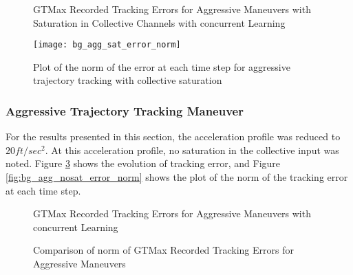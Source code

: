 \begin{figure}[H]
\centering
{}
\caption{GTMax Recorded Tracking Errors for Aggressive Maneuvers with Saturation in Collective Channels with concurrent Learning}
\label{fig:oval_sat_errors}
\end{figure}

\begin{figure}[H]
\centering
\texttt{[image: bg\_agg\_sat\_error\_norm]}
\caption{Plot of the norm of the error at each time step for aggressive trajectory tracking with collective saturation}
\label{fig:bg_agg_Sat_error_norm}
\end{figure}

\subsubsection{Aggressive Trajectory Tracking Maneuver}
For the results presented in this section, the acceleration profile was reduced to $20ft/sec^2$. At this acceleration profile, no saturation in the collective input was noted. Figure \ref{fig:oval_nosat_errors} shows the evolution of tracking error, and Figure \ref{fig:bg_agg_nosat_error_norm} shows the plot of the norm of the tracking error at each time step.
\begin{figure}[H]
\centering
{}
\caption{GTMax Recorded Tracking Errors for Aggressive Maneuvers with concurrent Learning}
\label{fig:oval_nosat_errors}
\end{figure}

\begin{figure}[H]
\centering
{}
\caption{Comparison of norm of GTMax Recorded Tracking Errors for Aggressive Maneuvers}
\label{fig:oval_comparision_error_norm}
\end{figure}

